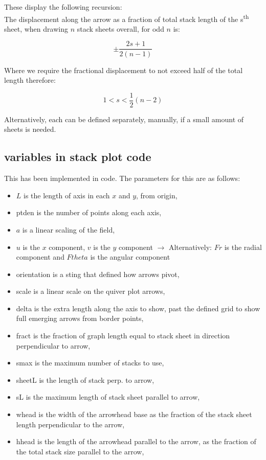 \documentclass[11]{report}
\begin{document}
These display the following recursion:\\
The displacement along the arrow as a fraction of total stack length of the s\textsuperscript{th} sheet, when drawing $n$ stack sheets overall, for odd $n$ is:

\[ \pm\frac{2s+1}{2 \left( n-1 \right) } \]

Where we require the fractional displacement to not exceed half of the total length therefore:

\[ 1 < s < \frac{1}{2} \left( n-2 \right) \]

Alternatively, each can be defined separately, manually, if a small amount of sheets is needed.

\subsection{variables in stack plot code}

This has been implemented in code. The parameters for this are as follows:

\begin{itemize}
	\item $L$ is the length of axis in each $x$ and $y$, from origin,
	\item pt\textunderscore den is the number of points along each axis,
	\item $a$ is a linear scaling of the field,	
	\item $u$ is the $x$ component, $v$ is the $y$ component $\longrightarrow$  Alternatively: $Fr$ is the radial component and $Ftheta$ is the angular component
	\item orientation is a sting that defined how arrows pivot,
	\item scale is a linear scale on the quiver plot arrows,
	\item delta is the extra length along the axis to show, past the defined grid to show full emerging arrows from border points,
	\item fract is the fraction of graph length equal to stack sheet in direction perpendicular to arrow,
	\item s\textunderscore max is the maximum number of stacks to use,
	\item sheet\textunderscore L is the length of stack perp. to arrow,
	\item s\textunderscore L is the maximum length of stack sheet parallel to arrow,
	\item w\textunderscore head is the width of the arrowhead base as the fraction of the stack sheet length perpendicular to the arrow,
	\item h\textunderscore head is the length of the arrowhead parallel to the arrow, as the fraction of the total stack size parallel to the arrow,

\end{itemize}
\end{document}
